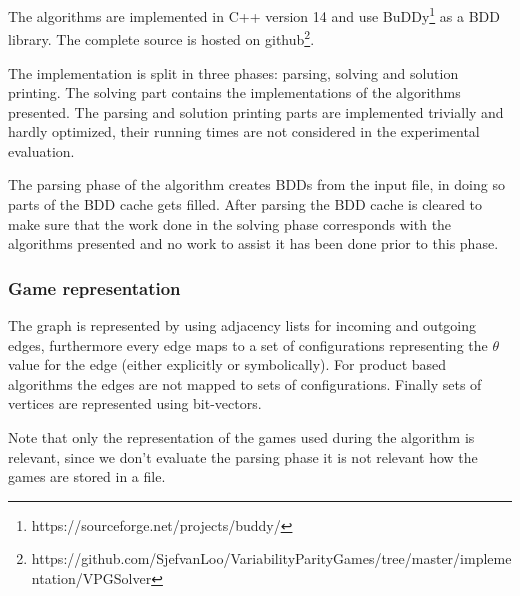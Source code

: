 The algorithms are implemented in C++ version 14 and use BuDDy\footnote{\label{note1}https://sourceforge.net/projects/buddy/} as a BDD library. The complete source is hosted on github\footnote{\label{note2}https://github.com/SjefvanLoo/VariabilityParityGames/tree/master/implementation/VPGSolver}.

The implementation is split in three phases: parsing, solving and solution printing. The solving part contains the implementations of the algorithms presented. The parsing and solution printing parts are implemented trivially and hardly optimized, their running times are not considered in the experimental evaluation.

The parsing phase of the algorithm creates BDDs from the input file, in doing so parts of the BDD cache gets filled. After parsing the BDD cache is cleared to make sure that the work done in the solving phase corresponds with the algorithms presented and no work to assist it has been done prior to this phase.

\subsubsection{Game representation}
The graph is represented by using adjacency lists for incoming and outgoing edges, furthermore every edge maps to a set of configurations representing the $\theta$ value for the edge (either explicitly or symbolically). For product based algorithms the edges are not mapped to sets of configurations. Finally sets of vertices are represented using bit-vectors.

Note that only the representation of the games used during the algorithm is relevant, since we don't evaluate the parsing phase it is not relevant how the games are stored in a file.
